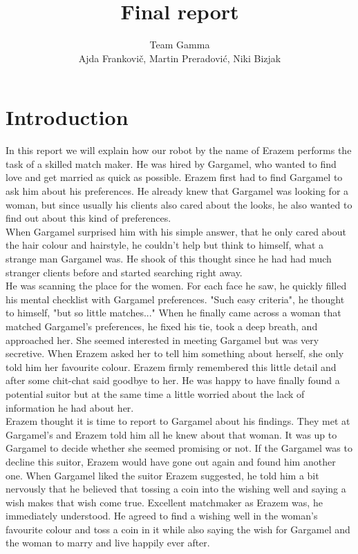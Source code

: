 \documentclass[12pt,a4paper]{article}
\author{Team Gamma \\ {\small Ajda Frankovič, Martin Preradović, Niki Bizjak}}
\title{Final report}
\date{}
\begin{document}
	
	\maketitle

	\tableofcontents
	
	\section{Introduction}
	In this report we will explain how our robot by the name of Erazem performs the task of a skilled match maker. He was hired by Gargamel, who wanted to find love and get married as quick as possible. Erazem first had to find Gargamel to ask him about his preferences. He already knew that Gargamel was looking for a woman, but since usually his clients also cared about the looks, he also wanted to find out about this kind of preferences. \\
	
	When Gargamel surprised him with his simple answer, that he only cared about the hair colour and hairstyle, he couldn't help but think to himself, what a strange man Gargamel was. He shook of this thought since he had had much stranger clients before and started searching right away. \\

	He was scanning the place for the women. For each face he saw, he quickly filled his mental checklist with Gargamel preferences. "Such easy criteria", he thought to himself, "but so little matches..." When he finally came across a woman that matched Gargamel's preferences, he fixed his tie, took a deep breath, and approached her. She seemed interested in meeting Gargamel but was very secretive. When Erazem asked her to tell him something about herself, she only told him her favourite colour. Erazem firmly remembered this little detail and after some chit-chat said goodbye to her. He was happy to have finally found a potential suitor but at the same time a little worried about the lack of information he had about her. \\
	
	Erazem thought it is time to report to Gargamel about his findings. They met at Gargamel's and Erazem told him all he knew about that woman. It was up to Gargamel to decide whether she seemed promising or not. If the Gargamel was to decline this suitor, Erazem would have gone out again and found him another one. When Gargamel liked the suitor Erazem suggested, he told him a bit nervously that he believed that tossing a coin into the wishing well and saying a wish makes that wish come true. Excellent matchmaker as Erazem was, he immediately understood. He agreed to find a wishing well in the woman's favourite colour and toss a coin in it while also saying the wish for Gargamel and the woman to marry and live happily ever after. \\
\end{document}
